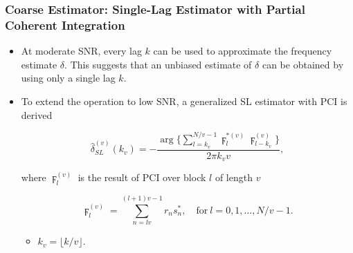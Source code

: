 \begin{frame}
  \frametitle{Coarse Estimator: Single-Lag Estimator with Partial Coherent Integration}

    \begin{itemize}
    
      \item At moderate SNR, every lag $k$ can be used to approximate the frequency estimate $\delta$. This suggests that an unbiased estimate of $\delta$ can be obtained by using only a single lag $k$.
      \item To extend the operation to low SNR, a generalized SL estimator with PCI is derived
      
      \begin{equation}
        \label{eq:single_lag_estimator_w_partial_corr}
        \hat{\delta}_{SL}^{(v)}(k_v)=-\frac{\arg\big\{\sum_{l=k_v}^{N/v-1}\digamma_l^{*(v)}\digamma_{l-k_v}^{(v)}\big\}}{2\pi k_vv},
      \end{equation}

      where $\digamma_{l}^{(v)}$ is the result of PCI over block $l$
      of length $v$

      \begin{equation}
        \label{eq:coherent_integrator}
        \digamma_l^{(v)}=\sum_{n=lv}^{(l+1)v-1}r_ns_n^*, \quad \text{for}~l=0,1,\ldots,N/v{-}1.
      \end{equation}

      \begin{itemize}
        \item  $k_v=\lfloor k/v \rfloor$.
      \end{itemize}

    \end{itemize}



\end{frame}



